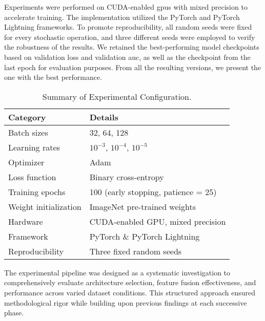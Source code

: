 Experiments were performed on CUDA-enabled \acp{gpu} with mixed precision to accelerate training. The implementation utilized the PyTorch and PyTorch Lightning frameworks. To promote reproducibility, all random seeds were fixed for every stochastic operation, and three different seeds were employed to verify the robustness of the results. We retained the best-performing model checkpoints based on validation loss and validation \ac{auc}, as well as the checkpoint from the last epoch for evaluation purposes. From all the resulting versions, we present the one with the best performance.

\begin{table}[ht]
\centering
\caption{Summary of Experimental Configuration.}
\begin{tabular}{ll}
\toprule
\textbf{Category} & \textbf{Details} \\
\midrule
Batch sizes           & 32, 64, 128 \\
Learning rates        & $10^{-3}$, $10^{-4}$, $10^{-5}$ \\
Optimizer             & Adam \\
Loss function         & Binary cross-entropy \\
Training epochs       & 100 (early stopping, patience = 25) \\
Weight initialization & ImageNet pre-trained weights \\
\midrule
Hardware              & CUDA-enabled GPU, mixed precision \\
Framework             & PyTorch \& PyTorch Lightning \\
Reproducibility       & Three fixed random seeds \\
\bottomrule
\end{tabular}
\label{tab:experimental-setup}
\end{table}



The experimental pipeline was designed as a systematic investigation to comprehensively evaluate architecture selection, feature fusion effectiveness, and performance across varied dataset conditions. This structured approach ensured methodological rigor while building upon previous findings at each successive phase.

